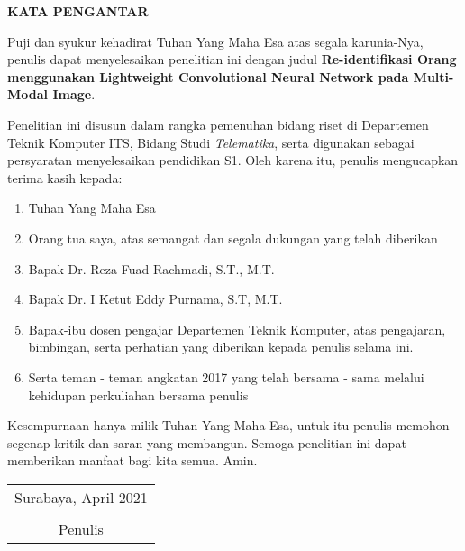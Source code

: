 \begin{center}
\Large\textbf{KATA PENGANTAR}
\end{center}
\vspace{1ex}

\setlength{\parindent}{0.9cm} Puji dan syukur kehadirat Tuhan Yang Maha Esa atas segala karunia-Nya, penulis  dapat menyelesaikan penelitian ini dengan judul \textbf{Re-identifikasi Orang menggunakan Lightweight Convolutional Neural Network pada Multi-Modal Image}.
\vspace{1ex}

Penelitian ini disusun dalam rangka pemenuhan bidang riset di Departemen Teknik Komputer ITS, Bidang Studi \textit{Telematika}, serta digunakan sebagai persyaratan menyelesaikan pendidikan  S1. Oleh karena itu, penulis mengucapkan terima kasih kepada:
\vspace{1ex}

\begin{enumerate}[nolistsep]
  \item Tuhan Yang Maha Esa
  \item Orang tua saya, atas semangat dan segala dukungan yang telah diberikan
  \item Bapak Dr. Reza Fuad Rachmadi, S.T., M.T.
  \item Bapak Dr. I Ketut Eddy Purnama, S.T, M.T.
  \item Bapak-ibu dosen pengajar Departemen Teknik Komputer, atas pengajaran, bimbingan, serta perhatian yang diberikan kepada penulis selama ini.
  \item Serta teman - teman angkatan 2017 yang telah bersama - sama melalui kehidupan perkuliahan bersama penulis
\end{enumerate}
\vspace{1ex}

Kesempurnaan hanya milik Tuhan Yang Maha Esa, untuk itu penulis memohon segenap kritik dan saran yang  membangun. Semoga penelitian ini dapat memberikan manfaat bagi kita semua. Amin.
\begin{flushright}
\begin{tabular}[b]{c}
  Surabaya, April 2021
  \\
  \\
  Penulis
\end{tabular}
\end{flushright}